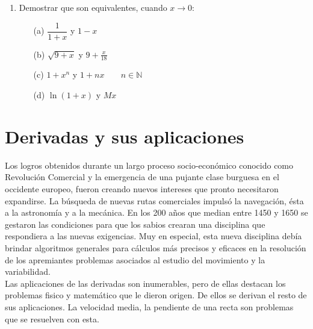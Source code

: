 \documentclass[10pt,twoside]{SelfArx} %
\begin{document}
\begin{enumerate}
\begin{enumerate}
		\end{enumerate}
	
	\item	Demostrar que son equivalentes, cuando $ x\rightarrow0 $:	%
		\begin{enumerate}
			\item[(a)]	$ \dfrac{1}{1+x} $ y $  1-x $ 
			\item[(b)]	$ \sqrt{9+x} $ y $ 9+\frac{x}{18} $
			\item[(c)]	$ 1+x^{n} $ y $ 1+nx\;\;\;\;\;\;\;n\in\mathbb{N}$
			\item[(d)]	$ \ln(1+x) $ y $ Mx $
		\end{enumerate}

	
\end{enumerate}


\newpage
\section{Derivadas y sus aplicaciones}
Los logros obtenidos durante un largo proceso socio-económico conocido como Revolución Comercial y la emergencia de una pujante clase burguesa en el occidente europeo, fueron creando nuevos intereses que pronto necesitaron expandirse. La búsqueda de nuevas rutas comerciales impulsó la navegación, ésta a la astronomía y a la mecánica. En los 200 años que median entre 1450 y 1650 se gestaron las condiciones para que los sabios crearan una disciplina que respondiera a las nuevas exigencias. Muy en especial, esta nueva disciplina debía brindar algoritmos generales para cálculos más precisos y eficaces en la resolución de los apremiantes problemas asociados al estudio del movimiento y la variabilidad. \\
Las aplicaciones de las derivadas son inumerables, pero de ellas destacan los problemas fisico y matemático que le dieron origen. De ellos se derivan el resto de sus aplicaciones. La velocidad media, la pendiente de una recta son problemas que se resuelven con esta.
\end{document}
